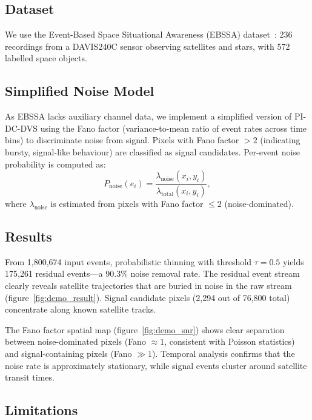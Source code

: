 \documentclass[12pt]{article}
\begin{document}
\subsection{Dataset}

We use the Event-Based Space Situational Awareness (EBSSA) dataset~\cite{C1}: 236 recordings from a DAVIS240C sensor observing satellites and stars, with 572 labelled space objects.

\subsection{Simplified Noise Model}

As EBSSA lacks auxiliary channel data, we implement a simplified version of PI-DC-DVS using the Fano factor (variance-to-mean ratio of event rates across time bins) to discriminate noise from signal.
Pixels with Fano factor $>2$ (indicating bursty, signal-like behaviour) are classified as signal candidates.
Per-event noise probability is computed as:
\begin{equation}
  P_\mathrm{noise}(e_i) = \frac{\lambda_\mathrm{noise}(x_i, y_i)}{\lambda_\mathrm{total}(x_i, y_i)},
\end{equation}
where $\lambda_\mathrm{noise}$ is estimated from pixels with Fano factor $\leq 2$ (noise-dominated).

\subsection{Results}

From 1,800,674 input events, probabilistic thinning with threshold $\tau = 0.5$ yields 175,261 residual events---a 90.3\% noise removal rate.
The residual event stream clearly reveals satellite trajectories that are buried in noise in the raw stream (figure~\ref{fig:demo_result}).
Signal candidate pixels (2,294 out of 76,800 total) concentrate along known satellite tracks.

The Fano factor spatial map (figure~\ref{fig:demo_snr}) shows clear separation between noise-dominated pixels (Fano $\approx 1$, consistent with Poisson statistics) and signal-containing pixels (Fano $\gg 1$).
Temporal analysis confirms that the noise rate is approximately stationary, while signal events cluster around satellite transit times.

\subsection{Limitations}
\end{document}
